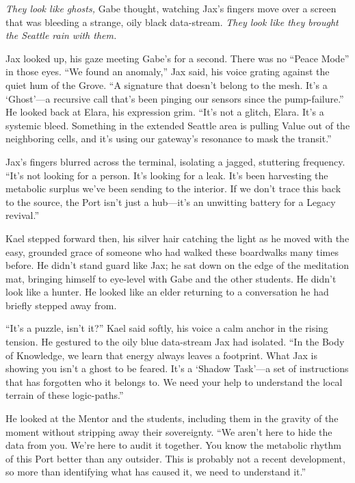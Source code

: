 \textit{They look like ghosts,} Gabe thought, watching Jax's fingers move over a screen that was bleeding a strange, oily black data-stream. \textit{They look like they brought the Seattle rain with them.} 


Jax looked up, his gaze meeting Gabe's for a second. There was no ``Peace Mode'' in those eyes. ``We found an anomaly,'' Jax said, his voice grating against the quiet hum of the Grove. ``A signature that doesn't belong to the mesh. It's a `Ghost'—a recursive call that's been pinging our sensors since the pump-failure.'' He looked back at Elara, his expression grim. ``It's not a glitch, Elara. It's a systemic bleed. Something in the extended Seattle area is pulling Value out of the neighboring cells, and it's using our gateway's resonance to mask the transit.''

Jax's fingers blurred across the terminal, isolating a jagged, stuttering frequency. ``It's not looking for a person. It's looking for a leak. It's been harvesting the metabolic surplus we've been sending to the interior. If we don't trace this back to the source, the Port isn't just a hub—it's an unwitting battery for a Legacy revival.''


Kael stepped forward then, his silver hair catching the light as he moved with the easy, grounded grace of someone who had walked these boardwalks many times before. He didn't stand guard like Jax; he sat down on the edge of the meditation mat, bringing himself to eye-level with Gabe and the other students. He didn't look like a hunter. He looked like an elder returning to a conversation he had briefly stepped away from.

``It's a puzzle, isn't it?'' Kael said softly, his voice a calm anchor in the rising tension. He gestured to the oily blue data-stream Jax had isolated. ``In the Body of Knowledge, we learn that energy always leaves a footprint. What Jax is showing you isn't a ghost to be feared. It's a `Shadow Task'—a set of instructions that has forgotten who it belongs to. We need your help to understand the local terrain of these logic-paths.''

He looked at the Mentor and the students, including them in the gravity of the moment without stripping away their sovereignty. ``We aren't here to hide the data from you. We're here to audit it together. You know the metabolic rhythm of this Port better than any outsider. This is probably not a recent development, so more than identifying what has caused it, we need to understand it.''

